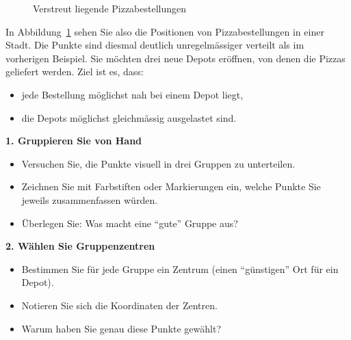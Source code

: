 \begin{lpu}
\begin{figure}[h]
\caption{Verstreut liegende Pizzabestellungen}
\label{fig:pizza_kmeans_variante}
\end{figure}

\begin{aufgabe}{2}
In Abbildung~\ref{fig:pizza_kmeans_variante} sehen Sie also die Positionen von Pizzabestellungen in einer Stadt. Die Punkte sind diesmal deutlich unregelmässiger verteilt als im vorherigen Beispiel. Sie möchten drei neue Depots eröffnen, von denen die Pizzas geliefert werden. Ziel ist es, dass:

\begin{itemize}
  \item jede Bestellung möglichst nah bei einem Depot liegt,
  \item die Depots möglichst gleichmässig ausgelastet sind.
\end{itemize}

\vspace{1em}
\textbf{1. Gruppieren Sie von Hand}

\begin{itemize}
  \item Versuchen Sie, die Punkte visuell in drei Gruppen zu unterteilen.
  \item Zeichnen Sie mit Farbstiften oder Markierungen ein, welche Punkte Sie jeweils zusammenfassen würden.
  \item Überlegen Sie: Was macht eine ``gute'' Gruppe aus?
\end{itemize}

\vspace{1em}
\textbf{2. Wählen Sie Gruppenzentren}

\begin{itemize}
  \item Bestimmen Sie für jede Gruppe ein Zentrum (einen ``günstigen'' Ort für ein Depot).
  \item Notieren Sie sich die Koordinaten der Zentren.
  \item Warum haben Sie genau diese Punkte gewählt?
\end{itemize}


\end{aufgabe}
\end{lpu}
